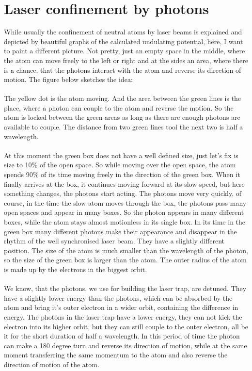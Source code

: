 
\section{Laser confinement by photons}

While usually the confinement of neutral atoms by laser beams is explained and depicted by beautiful graphs of the calculated undulating potential, here, I want to paint a different picture. Not pretty, just an empty space in the middle, where the atom can move freely to the left or right and at the sides an area, where there is a chance, that the photons interact with the atom and reverse its direction of motion. The figure below sketches the idea:




\paragraph{}
The yellow dot is the atom moving. And the area between the green lines is the place, where a photon can couple to the atom and reverse the motion. So the atom is locked between the green areas as long as there are enough photons are available to couple. The distance from two green lines tool the next two is half a wavelength.
\paragraph{}
At this moment the green box does not have a well defined size, just let's fix is size to 10\% of the open space. So while moving over the open space, the atom spends 90\% of its time moving freely in the direction of the green box. When it finally arrives at the box, it continues moving forward at its slow speed, but here something changes, the photons start acting. The photons move very quickly, of course, in the time the slow atom moves through the box, the photons pass many open spaces and appear in many boxes. So the photon appears in many different boxes, while the atom stays almost motionless in its single box. In its time in the green box many different photons make their appearance and disappear in the rhythm of the well synchronised laser beam. They have a slightly different position. The size of the atom is much smaller than the wavelength of the photon, so the size of the green box is larger than the atom. The outer radius of the atom is made up by the electrons in the biggest orbit.
\paragraph{}
We know, that the photons, we use for building the laser trap, are detuned. They have a slightly lower energy than the photons, which can be absorbed by the atom and bring it's outer electron in a wider orbit, containing the difference in energy. The photons in the laser trap have a lower energy, they can not kick the electron into its higher orbit, but they can still couple to the outer electron, all be it for the short duration of half a wavelength. In this period of time the photon can make a 180 degree turn and reverse its direction of motion, while at the same moment transferring the same momentum to the atom and also reverse the direction of motion of the atom.


